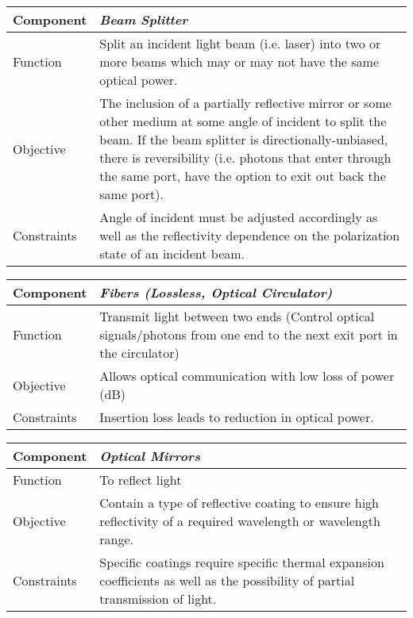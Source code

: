 \begin{center}
    \begin{tabular}{|m{6em}| m{12cm}|}
    \hline 
    \textbf{Component} & \textit{Beam Splitter} \\
    \hline
    Function & Split an incident light beam (i.e. laser) into two or more beams which may or may not have the same optical power. \\
    \hline
    Objective & The inclusion of a partially reflective mirror or some other medium at some angle of incident to split the beam. If the beam splitter is directionally-unbiased, there is reversibility (i.e. photons that enter through the same port, have the option to exit out back the same port). \\
    \hline
    Constraints & Angle of incident must be adjusted accordingly as well as the reflectivity dependence on the polarization state of an incident beam. \\
    \hline
    \end{tabular}
\end{center}

\begin{center}
    \begin{tabular}{|m{6em}|m{12cm}|}
    \hline
    \textbf{Component} & \textit{Fibers (Lossless, Optical Circulator)} \\
    \hline
    Function & Transmit light between two ends (Control optical signals/photons from one end to the next exit port in the circulator)\\
    \hline
    Objective & Allows optical communication with low loss of power (dB)\\
    \hline 
    Constraints & Insertion loss leads to reduction in optical power. \\
    \hline
    \end{tabular}
\end{center}

\begin{center}
    \begin{tabular}{|m{6em}|m{12cm}|}
    \hline
    \textbf{Component} & \textit{Optical Mirrors} \\
    \hline
    Function & To reflect light\\
    \hline
    Objective & Contain a type of reflective coating to ensure high reflectivity of a required wavelength or wavelength range.\\
    \hline 
    Constraints & Specific coatings require specific thermal expansion coefficients as well as the possibility of partial transmission of light. \\
    \hline
    \end{tabular}
\end{center}
\newpage

